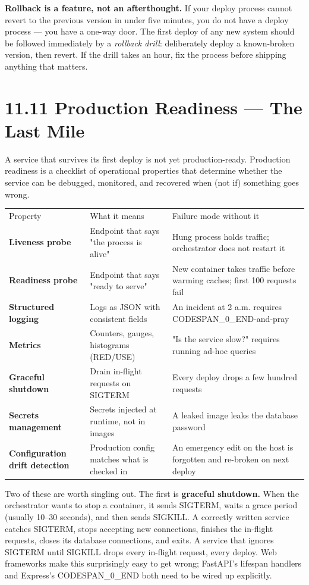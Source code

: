 \documentclass[11pt,a4paper]{book}
\begin{document}
\textbf{Rollback is a feature, not an afterthought.} If your deploy process cannot revert to the previous version in under five minutes, you do not have a deploy process --- you have a one-way door. The first deploy of any new system should be followed immediately by a \textit{rollback drill}: deliberately deploy a known-broken version, then revert. If the drill takes an hour, fix the process before shipping anything that matters.

\medskip

\section{11.11 Production Readiness --- The Last Mile}

A service that survives its first deploy is not yet production-ready. Production readiness is a checklist of operational properties that determine whether the service can be debugged, monitored, and recovered when (not if) something goes wrong.

\begin{tabular}{lll}
\hline
Property & What it means & Failure mode without it \\
\textbf{Liveness probe} & Endpoint that says "the process is alive" & Hung process holds traffic; orchestrator does not restart it \\
\textbf{Readiness probe} & Endpoint that says "ready to serve" & New container takes traffic before warming caches; first 100 requests fail \\
\textbf{Structured logging} & Logs as JSON with consistent fields & An incident at 2 a.m. requires CODESPAN\_0\_END-and-pray \\
\textbf{Metrics} & Counters, gauges, histograms (RED/USE) & "Is the service slow?" requires running ad-hoc queries \\
\textbf{Graceful shutdown} & Drain in-flight requests on SIGTERM & Every deploy drops a few hundred requests \\
\textbf{Secrets management} & Secrets injected at runtime, not in images & A leaked image leaks the database password \\
\textbf{Configuration drift detection} & Production config matches what is checked in & An emergency edit on the host is forgotten and re-broken on next deploy \\
\hline
\end{tabular}

Two of these are worth singling out. The first is \textbf{graceful shutdown.} When the orchestrator wants to stop a container, it sends SIGTERM, waits a grace period (usually 10--30 seconds), and then sends SIGKILL. A correctly written service catches SIGTERM, stops accepting new connections, finishes the in-flight requests, closes its database connections, and exits. A service that ignores SIGTERM until SIGKILL drops every in-flight request, every deploy. Web frameworks make this surprisingly easy to get wrong; FastAPI's lifespan handlers and Express's CODESPAN\_0\_END both need to be wired up explicitly.
\end{document}
